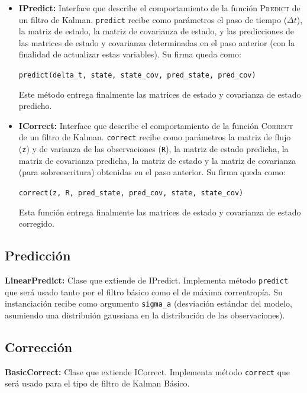 \begin{itemize}
\item \textbf{IPredict:} Interface que describe el comportamiento de la funci\'on \textsc{Predict} de un filtro de Kalman. \texttt{predict} recibe como par\'ametros el paso de tiempo ($\Delta t$), la matriz de estado, la matriz de covarianza de estado, y las predicciones de las matrices de estado y covarianza determinadas en el paso anterior (con la finalidad de actualizar estas variables). Su firma queda como:
\begin{center}
\texttt{predict(delta\_t, state, state\_cov, pred\_state, pred\_cov)}
\end{center}
Este m\'etodo entrega finalmente las matrices de estado y covarianza de estado predicho.
\bigskip

\item \textbf{ICorrect:} Interface que describe el comportamiento de la funci\'on \textsc{Correct} de un filtro de Kalman. \texttt{correct} recibe como par\'ametros la matriz de flujo (\texttt{z}) y de varianza de las observaciones (\texttt{R}), la matriz de estado predicha, la matriz de covarianza predicha, la matriz de estado y la matriz de covarianza (para sobreescritura) obtenidas en el paso anterior. Su firma queda como:
\begin{center}
\texttt{correct(z, R, pred\_state, pred\_cov, state, state\_cov)}
\end{center}
\bigskip
Esta funci\'on entrega finalmente las matrices de estado y covarianza de estado corregido.

\end{itemize}

\subsection{Predicci\'on}
\textbf{LinearPredict:} Clase que extiende de IPredict. Implementa m\'etodo \texttt{predict} que ser\'a usado tanto por el filtro b\'asico como el de m\'axima correntrop\'ia. Su instanciaci\'on recibe como argumento \texttt{sigma\_a} (desviaci\'on est\'andar del modelo, asumiendo una distribui\'on gaussiana en la distribuci\'on de las observaciones).
\bigskip


\subsection{Correcci\'on}
\textbf{BasicCorrect:} Clase que extiende ICorrect. Implementa m\'etodo \texttt{correct} que ser\'a usado para el tipo de filtro de Kalman B\'asico.
\bigskip

